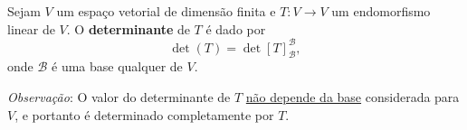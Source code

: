 \begin{definition}
	Sejam $V$ um espaço vetorial de dimensão finita e $T\colon V\to V$ um endomorfismo linear de $V$. O \textbf{determinante} de $T$ é dado por
	\[\det(T)=\det\left[T\right]_{\mathcal{B}}^{\mathcal{B}},\]
	onde $\mathcal{B}$ é uma base qualquer de $V$.
\end{definition}

\textit{Observação}: O valor do determinante de $T$ \href{teo_det_indep_base_moodle.html}{não depende da base} considerada para $V$, e portanto é determinado completamente por $T$.